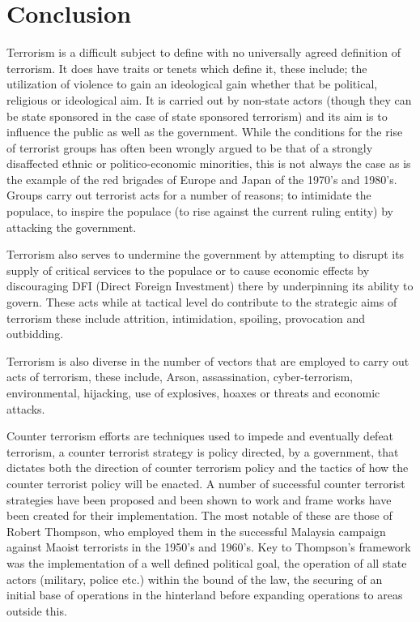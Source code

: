 \section{Conclusion}
Terrorism is a difficult subject to define with no universally agreed definition of terrorism. It does have traits or tenets which define it, these include; the utilization of violence to gain an ideological gain whether that be political, religious or ideological aim. It is carried out by non-state actors (though they can be state sponsored in the case of state sponsored terrorism) and its aim is to influence the public as well as the government. While the conditions for the rise of terrorist groups has often been wrongly argued to be that of a strongly disaffected ethnic or politico-economic minorities, this is not always the case as is the example of the red brigades of Europe and Japan of the 1970's and 1980's. Groups carry out terrorist acts for a number of reasons; to intimidate the populace, to inspire the populace (to rise against the current ruling entity) by attacking the government. 

Terrorism also serves to undermine the government by attempting to disrupt its supply of critical services to the populace or to cause economic effects by discouraging DFI (Direct Foreign Investment) there by underpinning its ability to govern. These acts while at tactical level do contribute to the strategic aims of terrorism these include attrition, intimidation, spoiling, provocation and outbidding.

Terrorism is also diverse in the number of vectors that are employed to carry out acts of terrorism, these include, Arson, assassination, cyber-terrorism, environmental, hijacking, use of explosives, hoaxes or threats and economic attacks.

Counter terrorism efforts are techniques used to impede and eventually defeat terrorism, a counter terrorist strategy is policy directed, by a government, that dictates both the direction of counter terrorism policy and the tactics of how the counter terrorist policy will be enacted. A number of successful counter terrorist strategies have been proposed and been shown to work and frame works have been created for their implementation. The most notable of these are those of Robert Thompson, who employed them in the successful Malaysia campaign against Maoist terrorists in the 1950's and 1960's. Key to Thompson's framework was the implementation of a well defined political goal, the operation of all state actors (military, police etc.) within the bound of the law, the securing of an initial base of operations in the hinterland before expanding operations to areas outside this.

